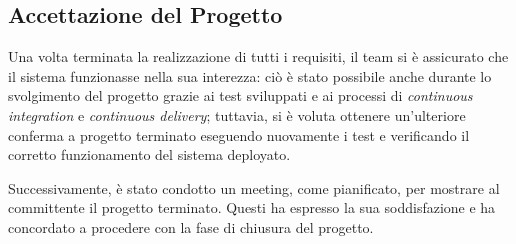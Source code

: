 \subsection{Accettazione del Progetto}
Una volta terminata la realizzazione di tutti i requisiti, il team si è assicurato che il sistema funzionasse nella sua interezza: ciò è stato possibile anche durante lo svolgimento del progetto grazie ai test sviluppati e ai processi di \textit{continuous integration} e \textit{continuous delivery}; tuttavia, si è voluta ottenere un'ulteriore conferma a progetto terminato eseguendo nuovamente i test e verificando il corretto funzionamento del sistema deployato.

Successivamente, è stato condotto un meeting, come pianificato, per mostrare al committente il progetto terminato. Questi ha espresso la sua soddisfazione e ha concordato a procedere con la fase di chiusura del progetto.